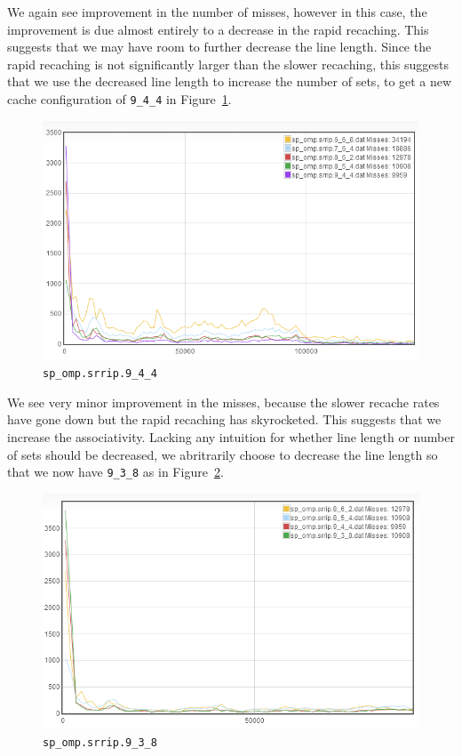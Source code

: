 We again see improvement in the number of misses, however in this case, the improvement is due almost entirely to a decrease in the rapid recaching. This suggests that we may have room to further decrease the line length. Since the rapid recaching is not significantly larger than the slower recaching, this suggests that we use the decreased line length to increase the number of sets, to get a new cache configuration of \texttt{9\_4\_4} in Figure~\ref{9_4_4}.

\begin{figure}[h]
\begin{center}
\includegraphics[width={0.9\columnwidth}]{images/sp_omp-srrip-9_4_4}
\end{center}
\caption{\texttt{sp\_omp.srrip.9\_4\_4}}
\label{9_4_4}
\end{figure}

We see very minor improvement in the misses, because the slower recache rates have gone down but the rapid recaching has skyrocketed. This suggests that we increase the associativity. Lacking any intuition for whether line length or number of sets should be decreased, we abritrarily choose to decrease the line length so that we now have \texttt{9\_3\_8} as in Figure~\ref{9_3_8}.

\begin{figure}[h]
\begin{center}
\includegraphics[width={0.9\columnwidth}]{images/sp_omp-srrip-9_3_8}
\end{center}
\caption{\texttt{sp\_omp.srrip.9\_3\_8}}
\label{9_3_8}
\end{figure}

